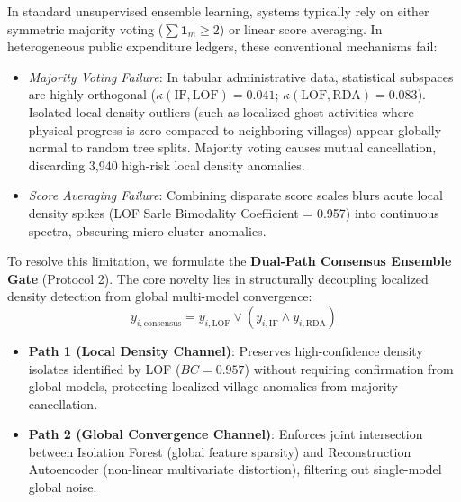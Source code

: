 \documentclass[conference]{IEEEtran}
\begin{document}
In standard unsupervised ensemble learning, systems typically rely on either symmetric majority voting ($\sum \mathbf{1}_m \ge 2$) or linear score averaging. In heterogeneous public expenditure ledgers, these conventional mechanisms fail:
\begin{itemize}
    \item \textit{Majority Voting Failure}: In tabular administrative data, statistical subspaces are highly orthogonal ($\kappa(\text{IF}, \text{LOF}) = 0.041$; $\kappa(\text{LOF}, \text{RDA}) = 0.083$). Isolated local density outliers (such as localized ghost activities where physical progress is zero compared to neighboring villages) appear globally normal to random tree splits. Majority voting causes mutual cancellation, discarding 3,940 high-risk local density anomalies.
    \item \textit{Score Averaging Failure}: Combining disparate score scales blurs acute local density spikes (LOF Sarle Bimodality Coefficient = 0.957) into continuous spectra, obscuring micro-cluster anomalies.
\end{itemize}

To resolve this limitation, we formulate the \textbf{Dual-Path Consensus Ensemble Gate} (Protocol 2). The core novelty lies in structurally decoupling localized density detection from global multi-model convergence:
\begin{equation}
y_{i, \mathrm{consensus}} = y_{i, \mathrm{LOF}} \lor \left(y_{i, \mathrm{IF}} \land y_{i, \mathrm{RDA}}\right)
\end{equation}
\begin{itemize}
    \item \textbf{Path 1 (Local Density Channel)}: Preserves high-confidence density isolates identified by LOF ($BC=0.957$) without requiring confirmation from global models, protecting localized village anomalies from majority cancellation.
    \item \textbf{Path 2 (Global Convergence Channel)}: Enforces joint intersection between Isolation Forest (global feature sparsity) and Reconstruction Autoencoder (non-linear multivariate distortion), filtering out single-model global noise.
\end{itemize}
\end{document}
